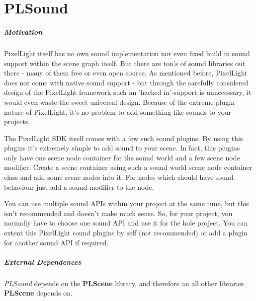 \chapter{PLSound}


\paragraph{Motivation}
PixelLight itself has no own sound implementation nor even fixed build in sound support within the scene graph itself. But there are ton's of sound libraries out there - many of them free or even open source. As mentioned before, PixelLight does not come with native sound support - but through the carefully considered design of the PixelLight framework such an 'hacked in'-support is unnecessary, it would even waste the sweet universal design. Because of the extreme plugin nature of PixelLight, it's no problem to add something like sounds to your projects.

The PixelLight \ac{SDK} itself comes with a few such sound plugins. By using this plugins it's extremely simple to add sound to your scene. In fact, this plugins only have one scene node container for the sound world and a few scene node modifier. Create a scene container using such a sound world scene node container class and add some scene nodes into it. For nodes which should have sound behaviour just add a sound modifier to the node.

You can use multiple sound \ac{API}s within your project at the same time, but this isn't recommended and doesn't make much sense. So, for your project, you normally have to choose one sound \ac{API} and use it for the hole project. You can extent this PixelLight sound plugins by self (not recommended) or add a plugin for another sound \ac{API} if required.


\paragraph{External Dependences}
\emph{PLSound} depends on the \textbf{PLScene} library, and therefore an all other libraries \textbf{PLScene} depends on.






\cleardoublepage
